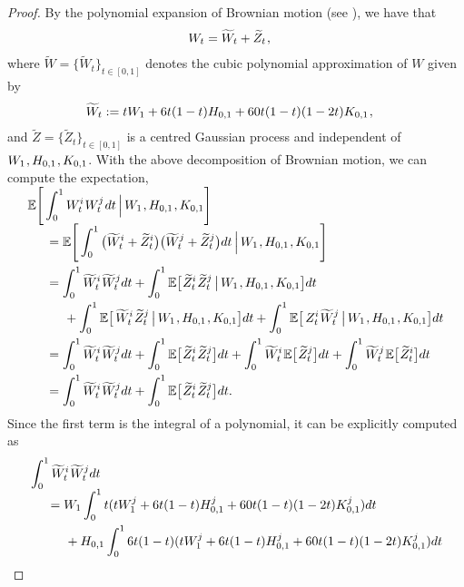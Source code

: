\documentclass[sn-mathphys-num]{sn-jnl}%
\newcommand{\E}{\mathbb{E}}
\newcommand{\m}{\hspace{0.25mm}}
\newcommand{\mm}{\hspace{5mm}}
\begin{document}
\begin{proof}
By the polynomial expansion of Brownian motion (see \cite{foster2020poly, habermann2021poly}), we have that
\begin{align}\label{eq:cubic_decomp}
W_t & = \widetilde{W}_t + \widetilde{Z}_t\m,
\end{align}
where $\widetilde{W} = \{\widetilde{W}_t\}_{t\in[0,1]}$ denotes the cubic polynomial approximation of $W$ given by
\begin{align}\label{eq:cubic}
\widetilde{W}_t & := tW_1 + 6t(1-t)H_{0,1} + 60t(1-t)(1-2t)K_{0,1}\m,
\end{align}
and $\widetilde{Z} = \{\widetilde{Z}_t\}_{t\in[0,1]}$ is a centred Gaussian process and independent of $W_1\m, H_{0,1}\m, K_{0,1}$.
With the above decomposition of Brownian motion, we can compute the expectation,
\begin{align*}
&\\[-22pt]
&\E\Bigg[\int_0^1 W_t^i\m W_t^j\m dt\,\Big|\, W_1\m, H_{0,1}\m, K_{0,1}\Bigg]\\[-5pt]
&\mm = \E\Bigg[\int_0^1 \big(\widetilde{W}_t^i + \widetilde{Z}_t^i\big)\big(\widetilde{W}_t^j + \widetilde{Z}_t^j\big) dt\,\Big|\, W_1\m, H_{0,1}\m, K_{0,1}\Bigg]\\
&\mm = \int_0^1\widetilde{W}_t^i\m\widetilde{W}_t^j dt +  \int_0^1 \E\big[\m \widetilde{Z}_t^i\m \widetilde{Z}_t^j\,\big|\, W_1\m, H_{0,1}\m, K_{0,1}\big] dt\\[-1pt]
&\mm\mm + \int_0^1 \E\big[\,\widetilde{W}_t^i\m \widetilde{Z}_t^j \,\big|\, W_1\m, H_{0,1}\m, K_{0,1}\big] dt + \int_0^1 \E\big[\,Z_t^i\m\widetilde{W}_t^j\,\big|\, W_1\m, H_{0,1}\m, K_{0,1}\big] dt\\
&\mm = \int_0^1\widetilde{W}_t^i\m\widetilde{W}_t^j dt + \int_0^1 \E\big[\m \widetilde{Z}_t^i\m \widetilde{Z}_t^j\big] dt + \int_0^1 \widetilde{W}_t^i\m\E\big[\m \widetilde{Z}_t^j\big] dt + \int_0^1 \widetilde{W}_t^j\m\E\big[\m \widetilde{Z}_t^i\big] dt\\
&\mm = \int_0^1\widetilde{W}_t^i\m\widetilde{W}_t^j dt + \int_0^1 \E\big[\m \widetilde{Z}_t^i\m \widetilde{Z}_t^j\big] dt.
\end{align*}
Since the first term is the integral of a polynomial, it can be explicitly computed as
\begin{align*}
&\int_0^1\widetilde{W}_t^i\m\widetilde{W}_t^j dt\\[-4pt]
&\mm = W_1\int_0^1 t(tW_1^j + 6t(1-t)H_{0,1}^j + 60t(1-t)(1-2t)K_{0,1}^j) dt\\
&\mm\mm + H_{0,1}\int_0^1 6t(1-t)(tW_1^j + 6t(1-t)H_{0,1}^j + 60t(1-t)(1-2t)K_{0,1}^j) dt\\

\end{align*}
\end{proof}
\end{document}
